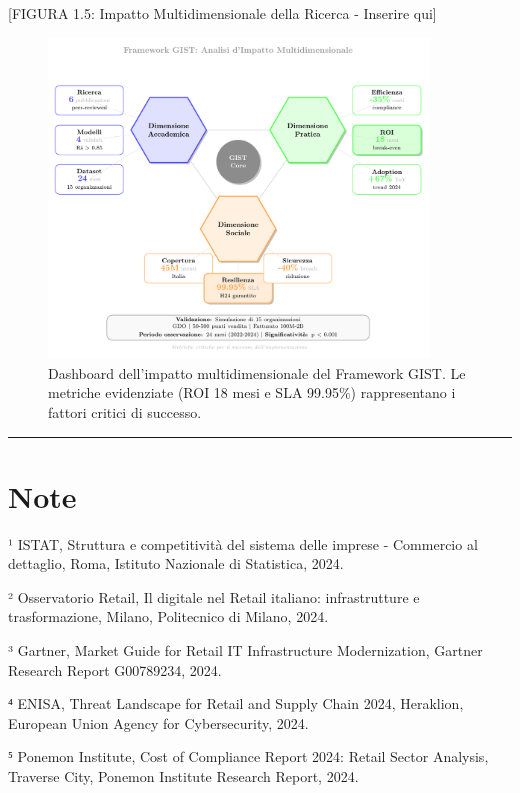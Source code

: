 \documentclass{report}
\begin{document}
{[}FIGURA 1.5: Impatto Multidimensionale della Ricerca - Inserire qui{]}

\begin{figure}[htbp]
    \centering
    \includegraphics[width=0.9\textwidth]{figura 1-5}
    \caption{Dashboard dell'impatto multidimensionale del Framework GIST. Le metriche evidenziate (ROI 18 mesi e SLA 99.95\%) rappresentano i fattori critici di successo.}
    \label{fig:impatto_gist}
\end{figure}

\begin{center}\rule{0.5\linewidth}{0.5pt}\end{center}

\section{\texorpdfstring{\textbf{Note}}{Note}}\label{note}

¹ ISTAT, Struttura e competitività del sistema delle imprese - Commercio
al dettaglio, Roma, Istituto Nazionale di Statistica, 2024.

² Osservatorio Retail, Il digitale nel Retail italiano: infrastrutture e
trasformazione, Milano, Politecnico di Milano, 2024.

³ Gartner, Market Guide for Retail IT Infrastructure Modernization,
Gartner Research Report G00789234, 2024.

⁴ ENISA, Threat Landscape for Retail and Supply Chain 2024, Heraklion,
European Union Agency for Cybersecurity, 2024.

⁵ Ponemon Institute, Cost of Compliance Report 2024: Retail Sector
Analysis, Traverse City, Ponemon Institute Research Report, 2024.
\end{document}
